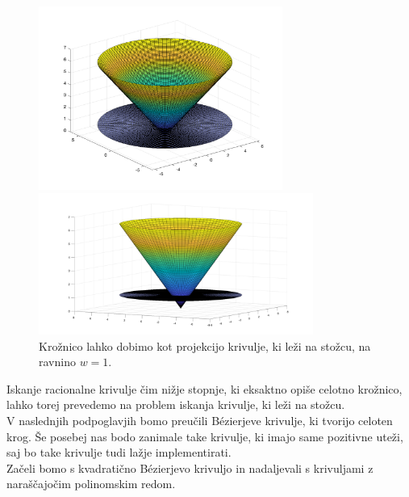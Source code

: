 \documentclass[a4paper,11pt]{article}
\theoremstyle{definition}
\theoremstyle{plain}
\begin{document}
\begin{figure}[ht!]
    \begin{minipage}{0.5\textwidth}
        \centering
        \includegraphics[width=80mm]{stozec.png}
    \end{minipage}\hfill
    \begin{minipage}{0.5\textwidth}
        \centering
        \includegraphics[width=90mm]{stozec_od_strani.png}
    \end{minipage}\hfill
    \caption{Krožnico lahko dobimo kot projekcijo krivulje, ki leži na stožcu, na ravnino $w = 1$.}
\end{figure}
\noindent
Iskanje racionalne krivulje čim nižje stopnje, ki eksaktno opiše celotno krožnico, lahko torej prevedemo na problem iskanja krivulje, ki leži na stožcu. 
\\
V naslednjih podpoglavjih bomo preučili B\'ezierjeve krivulje, ki tvorijo celoten krog. 
Še posebej nas bodo zanimale take krivulje, ki imajo same pozitivne uteži, saj bo take krivulje tudi lažje implementirati.
\\
Začeli bomo s kvadratično B\'ezierjevo krivuljo in nadaljevali s krivuljami z naraščajočim polinomskim redom.

\end{document}
